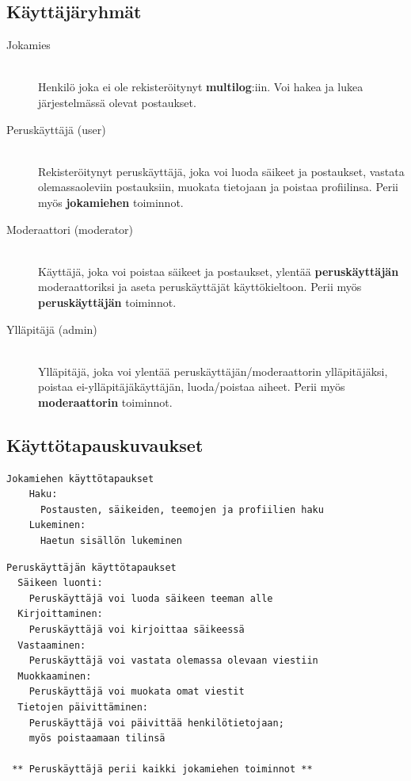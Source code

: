 \documentclass[10pt]{article}
\begin{document}
\subsection{Käyttäjäryhmät}
\begin{description}
  \item[Jokamies] \hfill \\
  Henkilö joka ei ole rekisteröitynyt \textbf{multilog}:iin. Voi hakea ja lukea järjestelmässä olevat postaukset.
  \item[Peruskäyttäjä (user)] \hfill \\
  Rekisteröitynyt peruskäyttäjä, joka voi luoda säikeet ja postaukset, vastata olemassaoleviin postauksiin, muokata tietojaan ja poistaa profiilinsa. Perii myös \textbf{jokamiehen} toiminnot.
  \item[Moderaattori (moderator)] \hfill \\
  Käyttäjä, joka voi poistaa säikeet ja postaukset, ylentää \textbf{peruskäyttäjän} moderaattoriksi ja aseta peruskäyttäjät käyttökieltoon. Perii myös \textbf{peruskäyttäjän} toiminnot.
  \item[Ylläpitäjä (admin)] \hfill \\
  Ylläpitäjä, joka voi ylentää peruskäyttäjän/moderaattorin ylläpitäjäksi, poistaa ei-ylläpitäjäkäyttäjän, luoda/poistaa aiheet. Perii myös \textbf{moderaattorin} toiminnot.
\end{description}

\subsection{Käyttötapauskuvaukset}
\begin{Verbatim}[frame=single]
Jokamiehen käyttötapaukset
    Haku:  
      Postausten, säikeiden, teemojen ja profiilien haku
    Lukeminen:
      Haetun sisällön lukeminen
\end{Verbatim}

\begin{Verbatim}[frame=single]
Peruskäyttäjän käyttötapaukset
  Säikeen luonti:
    Peruskäyttäjä voi luoda säikeen teeman alle
  Kirjoittaminen:
    Peruskäyttäjä voi kirjoittaa säikeessä
  Vastaaminen:
    Peruskäyttäjä voi vastata olemassa olevaan viestiin
  Muokkaaminen:
    Peruskäyttäjä voi muokata omat viestit
  Tietojen päivittäminen:
    Peruskäyttäjä voi päivittää henkilötietojaan; 
    myös poistaamaan tilinsä
    
 ** Peruskäyttäjä perii kaikki jokamiehen toiminnot **
\end{Verbatim}
\end{document}
